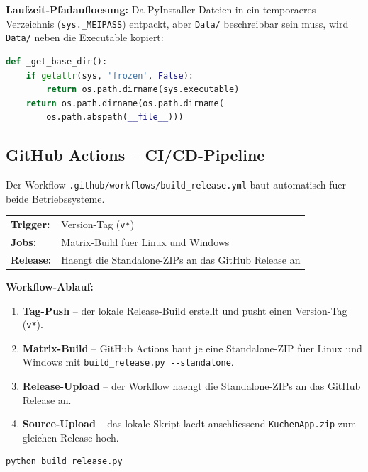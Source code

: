 \documentclass[12pt, a4paper]{article}
\begin{document}
\textbf{Laufzeit-Pfadaufloesung:} Da PyInstaller Dateien in ein temporaeres
Verzeichnis (\texttt{sys.\_MEIPASS}) entpackt, aber \texttt{Data/}
beschreibbar sein muss, wird \texttt{Data/} neben die Executable kopiert:

\begin{lstlisting}[language=Python, caption={Pfadaufloesung fuer PyInstaller}]
def _get_base_dir():
    if getattr(sys, 'frozen', False):
        return os.path.dirname(sys.executable)
    return os.path.dirname(os.path.dirname(
        os.path.abspath(__file__)))
\end{lstlisting}


\subsection{GitHub Actions -- CI/CD-Pipeline}

Der Workflow \texttt{.github/workflows/build\_release.yml} baut automatisch
fuer beide Betriebssysteme.

\begin{successbox}
\begin{tabularx}{\textwidth}{lX}
\textbf{Trigger:} & Version-Tag (\texttt{v*}) \\
\textbf{Jobs:} & Matrix-Build fuer Linux und Windows \\
\textbf{Release:} & Haengt die Standalone-ZIPs an das GitHub Release an \\
\end{tabularx}
\end{successbox}

\textbf{Workflow-Ablauf:}
\begin{enumerate}[leftmargin=1.5em]
    \item \textbf{Tag-Push} -- der lokale Release-Build erstellt und pusht
        einen Version-Tag (\texttt{v*}).
    \item \textbf{Matrix-Build} -- GitHub Actions baut je eine Standalone-ZIP
        fuer Linux und Windows mit \texttt{build\_release.py -{}-standalone}.
    \item \textbf{Release-Upload} -- der Workflow haengt die Standalone-ZIPs an
        das GitHub Release an.
    \item \textbf{Source-Upload} -- das lokale Skript laedt anschliessend
        \texttt{KuchenApp.zip} zum gleichen Release hoch.
\end{enumerate}

\begin{codebox}
\begin{lstlisting}[language=bash, numbers=none]
python build_release.py
\end{lstlisting}
\end{codebox}
\end{document}
